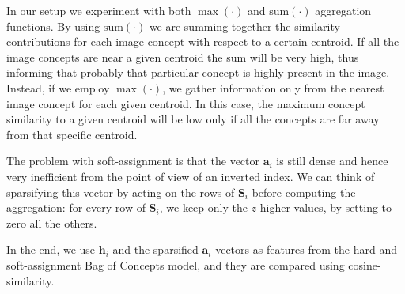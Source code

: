 \documentclass[conference]{IEEEtran}
\begin{document}
In our setup we experiment with both $\max(\cdot)$ and $\text{sum}(\cdot)$ aggregation functions. By using $\text{sum}(\cdot)$ we are summing together the similarity contributions for each image concept with respect to a certain centroid. If all the image concepts are near a given centroid the sum will be very high, thus informing that probably that particular concept is highly present in the image. Instead, if we employ $\max(\cdot)$, we gather information only from the nearest image concept for each given centroid. In this case, the maximum concept similarity to a given centroid will be low only if all the concepts are far away from that specific centroid.

The problem with soft-assignment is that the vector $\boldsymbol{a}_i$ is still dense and hence very inefficient from the point of view of an inverted index.
We can think of sparsifying this vector by acting on the rows of $\boldsymbol{S}_i$ before computing the aggregation: for every row of $\boldsymbol{S}_i$, we keep only the $z$ higher values, by setting to zero all the others.

In the end, we use $\boldsymbol{h}_i$ and the sparsified $\boldsymbol{a}_i$ vectors as features from the hard and soft-assignment Bag of Concepts model, and they are compared using cosine-similarity.
\end{document}
